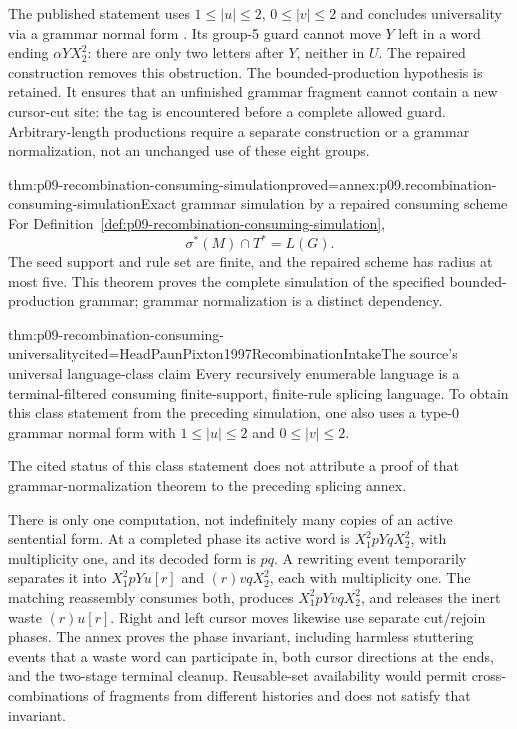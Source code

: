 The published statement uses \(1\leq|u|\leq2\), \(0\leq|v|\leq2\)
and concludes universality via a grammar normal form
\cite[Theorem~3.6, pp.~320--322]{HeadPaunPixton1997RecombinationIntake}.
Its group-5 guard cannot move \(Y\) left in a word ending
\(\alpha YX_2^2\): there are only two letters after \(Y\), neither
in \(U\). The repaired construction removes this obstruction.
The bounded-production hypothesis is retained. It ensures that an unfinished
grammar fragment cannot contain a new cursor-cut site: the tag is encountered
before a complete allowed guard. Arbitrary-length productions require a
separate construction or a grammar normalization, not an unchanged use of
these eight groups.

\begin{hbtheorem}{thm:p09-recombination-consuming-simulation}{proved=annex:p09.recombination-consuming-simulation}{Exact grammar simulation by a repaired consuming scheme}
For Definition~\ref{def:p09-recombination-consuming-simulation},
\[
 \sigma^*(M)\cap T^*=L(G).
\]
The seed support and rule set are finite, and the repaired scheme has radius
at most five. This theorem proves the complete simulation of the specified
bounded-production grammar; grammar normalization is a distinct dependency.
\end{hbtheorem}

\begin{hbcorollary}{thm:p09-recombination-consuming-universality}{cited=HeadPaunPixton1997RecombinationIntake}{The source's universal language-class claim}
Every recursively enumerable language is a terminal-filtered consuming
finite-support, finite-rule splicing language. To obtain this class statement
from the preceding simulation, one also uses a type-0 grammar normal form
with \(1\leq|u|\leq2\) and \(0\leq|v|\leq2\).
\end{hbcorollary}

The cited status of this class statement does not attribute a proof of that
grammar-normalization theorem to the preceding splicing annex.

There is only one computation, not indefinitely many copies of an active
sentential form. At a completed phase its active word is
\(X_1^2pYqX_2^2\), with multiplicity one, and its decoded form is
\(pq\). A rewriting event temporarily separates it into
\(X_1^2pYu[r]\) and \((r)vqX_2^2\), each with multiplicity one.
The matching reassembly consumes both, produces
\(X_1^2pYvqX_2^2\), and releases the inert waste \((r)u[r]\).
Right and left cursor moves likewise use separate cut/rejoin phases.
The annex proves the phase invariant, including harmless stuttering events
that a waste word can participate in, both cursor directions at the ends,
and the two-stage terminal cleanup. Reusable-set availability would permit
cross-combinations of fragments from different histories and does not
satisfy that invariant.

